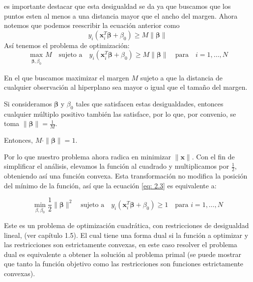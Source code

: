 \documentclass[letterpaper,12pt,oneside]{book}
\begin{document}
{{{        es importante destacar que esta desigualdad se da ya que buscamos que los puntos esten al menos a una distancia mayor que el ancho del margen. Ahora notemos que podemos reescribir la ecuación anterior como 
        $$
        y_i ( \mathbf{x}_i^T \boldsymbol{\beta} + \beta_0 ) \geq M \|\boldsymbol{\beta}\|
        $$
        Así tenemos el problema de optimización:
        \begin{equation}
            \max_{\substack{\boldsymbol{\beta},\beta_0}} M \quad \text{sujeto a} \quad y_i (\mathbf{x}_i^T \boldsymbol{\beta} + \beta_0) \geq M \|\boldsymbol{\beta}\| \quad \text{para} \quad i = 1, \ldots, N \label{eq: 2.3}
        \end{equation}
        
En el que buscamos maximizar el margen \( M \) sujeto a que la distancia de cualquier observación al hiperplano sea mayor o igual que el tamaño del margen.

Si consideramos \( \boldsymbol{\beta} \) y \( \beta_0 \) tales que satisfacen estas desigualdades, entonces cualquier múltiplo positivo también las satisface, por lo que, por convenio, se toma \( \|\boldsymbol{\beta}\| = \frac{1}{M} \).

Entonces, \( M \cdot \|\boldsymbol{\beta}\| = 1 \).

Por lo que nuestro problema ahora radica en minimizar \( \|\mathbf{x}\| \). Con el fin de simplificar el análisis, elevamos la función al cuadrado y multiplicamos por \( \frac{1}{2} \), obteniendo así una función convexa. Esta transformación no modifica la posición del mínimo de la función, así que la ecuación \eqref{eq: 2.3} es equivalente a:

        
        \begin{equation}
            \min_{\beta, \beta_0} \frac{1}{2} \|\boldsymbol{\beta}\|^2 \quad \text{sujeto a} \quad y_i (\mathbf{x}_i^T \boldsymbol{\beta} + \beta_0) \geq 1 \quad \text{para } i = 1, \ldots, N \label{eq: 2.4}
        \end{equation}
        
        
         Este es un problema de optimización cuadrática, con restricciones de desigualdad lineal, (ver capítulo 1.5).  El cual tiene una forma dual si la función a optimizar y las restricciones son estrictamente convexas, en este caso resolver el problema dual es equivalente a obtener la solución al problema primal (se puede mostrar que tanto la función objetivo como las restricciones son funciones estrictamente convexas).
            
}}}
\end{document}
